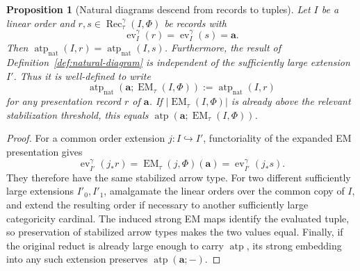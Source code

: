 \documentclass[11pt]{article}
\newcommand{\atp}{\operatorname{atp}}
\newcommand{\natatp}{\operatorname{atp}_{\mathrm{nat}}}
\newcommand{\Rec}{\operatorname{Rec}}
\newcommand{\EM}{\operatorname{EM}_{\tau}}
\newcommand{\ba}{\mathbf{a}}
\theoremstyle{plain}
\newtheorem{proposition}[definition]{Proposition}
\begin{document}
\begin{proposition}[Natural diagrams descend from records to tuples]
\label{prop:nat-record-independent}
Let $I$ be a linear order and
$r,s\in\Rec_\tau^\gamma(I,\Phi)$ be records with
\[
\operatorname{ev}_I^\gamma(r)
=\operatorname{ev}_I^\gamma(s)=\ba.
\]
Then
$\natatp(I,r)=\natatp(I,s)$.
Furthermore, the result of Definition~\ref{def:natural-diagram}
is independent of the sufficiently large extension $I'$.
Thus it is well-defined to write
\[
\natatp(\ba;\EM(I,\Phi))
:=\natatp(I,r)
\]
for \emph{any} presentation record $r$ of $\ba$.
If $|\EM(I,\Phi)|$ is already above the relevant
stabilization threshold, this equals
$\atp(\ba;\EM(I,\Phi))$.
\end{proposition}
\begin{proof}
For a common order extension $j:I\hookrightarrow I'$,
functoriality of the expanded EM presentation gives
\[
\operatorname{ev}_{I'}^\gamma(j_*r)
=\operatorname{EM}_{\tau}(j,\Phi)(\ba)
=\operatorname{ev}_{I'}^\gamma(j_*s).
\]
They therefore have the same stabilized arrow type.
For two different sufficiently large extensions
$I'_0,I'_1$, amalgamate the linear orders over
the common copy of $I$, and extend the resulting
order if necessary to another sufficiently large
categoricity cardinal. The induced strong EM maps
identify the evaluated tuple, so preservation of
stabilized arrow types makes the two values equal.
Finally, if the original reduct is already large
enough to carry $\atp$, its strong embedding into
any such extension preserves $\atp(\ba;-)$.
\end{proof}
\end{document}
